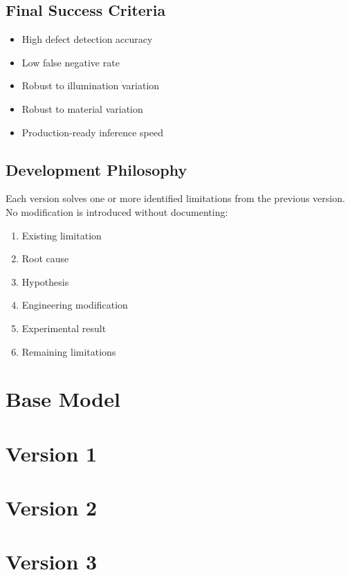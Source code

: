 \documentclass[12pt,a4paper]{report}
\begin{document}
\section{Final Success Criteria}

\begin{itemize}
    \item High defect detection accuracy
    \item Low false negative rate
    \item Robust to illumination variation
    \item Robust to material variation
    \item Production-ready inference speed
\end{itemize}

\section{Development Philosophy}

Each version solves one or more identified limitations from the previous version. No modification is introduced without documenting:

\begin{enumerate}
    \item Existing limitation
    \item Root cause
    \item Hypothesis
    \item Engineering modification
    \item Experimental result
    \item Remaining limitations
\end{enumerate}

\chapter{Base Model}
%

\chapter{Version 1}
%

\chapter{Version 2}
%

\chapter{Version 3}
%
\end{document}
